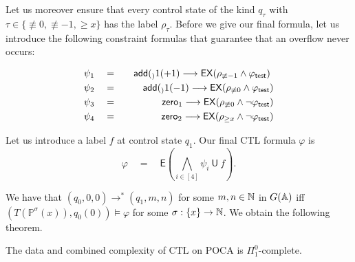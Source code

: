 \documentclass[times,envcountsame]{llncs}
\renewcommand{\mod}{\text{mod }}
\def\CTL{{\text{CTL}}}
\def\div{{\mathrm{div}}}
\def\U{{\mathsf{U}}}
\def\EX{{\mathsf{EX}}}
\def\E{{\mathsf{E}}}
\newcommand{\naturals}{\ensuremath{\mathbf{N}}}
\newcommand{\add}[1]{\ensuremath{\mathsf{add}(#1)}}
\newcommand{\zero}{\ensuremath{\mathsf{zero}}}
\newcommand{\Poca}{\mathbb{P}}
\begin{document}
\noindent
Let us moreover ensure that every control state of the kind
$q_{\tau}$ with $\tau\in\{\not\equiv 0,\not\equiv -1,\geq x\}$ has
the label $\rho_\tau$.
Before we give our final formula, let us introduce the following constraint
formulas that guarantee that an overflow never occurs:

\begin{eqnarray*}
\psi_1&\quad=\quad& \add_1(+1)\longrightarrow \EX(\rho_{\not\equiv-1}
\wedge\varphi_\test)\
\\
\psi_2&\quad=\quad&
\add_1(-1)\longrightarrow\EX(\rho_{\not\equiv 0}\wedge\varphi_\test)\\
\psi_3&\quad=\quad&
\zero_1\longrightarrow\EX(\rho_{\not\equiv 0}\wedge\neg\varphi_\test)\\
\psi_4&\quad=\quad&
\zero_2\longrightarrow\EX(\rho_{\geq x}\wedge\neg\varphi_{\test})\\
\end{eqnarray*}

\noindent
Let us introduce a label $f$ at control state $q_1$.
Our final CTL formula $\varphi$ is
$$
\varphi\quad=\quad\E\left(\bigwedge_{i\in[4]}\psi_i\ \U\  f\right).
$$
\iffalse
The correctness of the reduction follows from the following equivalences:
\begin{itemize}
\item $(T(\Poca),(q_0,0))\models \neg \varphi$
\item for all $\sigma:\{x\}\rightarrow \N$ we have $(\Poca^\sigma(x),q_0(0))\not\models\varphi$
\item for some $\sigma:\{x\}\rightarrow\N$ we have $(\Poca^\sigma(x),q_0(0))\models\varphi$
\item for some $\exists\sigma:\{x\}\rightarrow\N$ there is some path
$r_0(0)\rightarrow r_1(n_1)\cdots r_k(n_k)$ such that
$r_0=q_0$, $r_k=q_1$, $r_k\in F$ and
$(T(\Poca^\sigma(x)),r_i(n_i)





\end{itemize}
Then there is an assignment
$\sigma$ such that $(T(\Poca^\sigma),(q_0,0))\models \varphi$. It is
easily verified that the witnessing path $(q,0)(q_1,n_1)\ldots
(q',n')$ in $T(\A'(\sigma))$ corresponds to the path
$(q,0,0)(q_1,n_1\mod \sigma(x), n_1\div \sigma(x))\ldots (q',n'\mod
\sigma(x), n'\div \sigma(x))$ in $T(\A)$. Conversely, if
$(q,0,0)\rightarrow^* (q,n_1,n_2)$ in $T(\A)$, then the first counter
of $\A$ does not exceed some value $u \in \naturals$. Consequently, by
setting $\sigma(x):=u$, $(T(\A(\sigma)),(q,0))\models \varphi$.
\fi
We have that $(q_0,0,0)\rightarrow^*(q_1,m,n)$ for some $m,n\in\mathbb{N}$ in $G(\mathbb{A})$
iff
$(T(\Poca^\sigma(x)),q_0(0))\models\varphi$ for some
$\sigma:\{x\}\rightarrow\mathbb{N}$.
We obtain the following theorem.
\fi
\begin{theorem}
  The data and combined complexity of $\CTL$ on POCA is
  $\Pi^0_1$-complete.
  \label{thm:ctl-poca}
\end{theorem}
\end{document}
